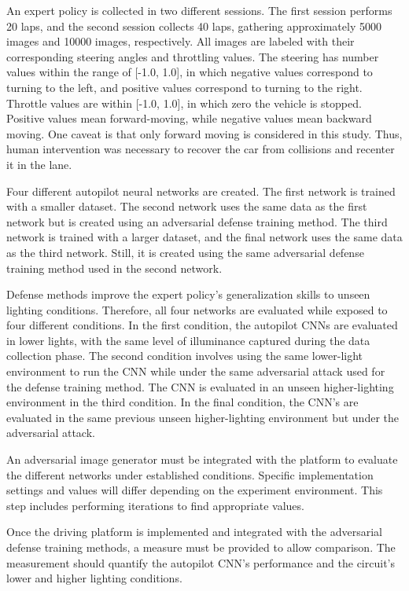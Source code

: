 \documentclass[12pt]{article}
\begin{document}
An expert policy is collected in two different sessions. The first session performs 20 laps, and the second session collects 40 laps, gathering approximately 5000 images and 10000 images, respectively. All images are labeled with their corresponding steering angles and throttling values.
The steering has number values within the range of [-1.0, 1.0], in which negative values correspond to turning to the left, and positive values correspond to turning to the right. Throttle values are within [-1.0, 1.0], in which zero the vehicle is stopped. Positive values mean forward-moving, while negative values mean backward moving. One caveat is that only forward moving is considered in this study. Thus, human intervention was necessary to recover the car from collisions and recenter it in the lane.  

Four different autopilot neural networks are created. The first network is trained with a smaller dataset. The second network uses the same data as the first network but is created using an adversarial defense training method. The third network is trained with a larger dataset, and the final network uses the same data as the third network. Still, it is created using the same adversarial defense training method used in the second network. 

Defense methods improve the expert policy's generalization skills to unseen lighting conditions. Therefore, all four networks are evaluated while exposed to four different conditions. In the first condition, the autopilot CNNs are evaluated in lower lights, with the same level of illuminance captured during the data collection phase. The second condition involves using the same lower-light environment to run the CNN while under the same adversarial attack used for the defense training method. The CNN is evaluated in an unseen higher-lighting environment in the third condition. In the final condition, the CNN's are evaluated in the same previous unseen higher-lighting environment but under the adversarial attack. 

An adversarial image generator must be integrated with the platform to evaluate the different networks under established conditions. Specific implementation settings and values will differ depending on the experiment environment. This step includes performing iterations to find appropriate values. 

Once the driving platform is implemented and integrated with the adversarial defense training methods, a measure must be provided to allow comparison. The measurement should quantify the autopilot CNN's performance and the circuit's lower and higher lighting conditions. 
\end{document}
